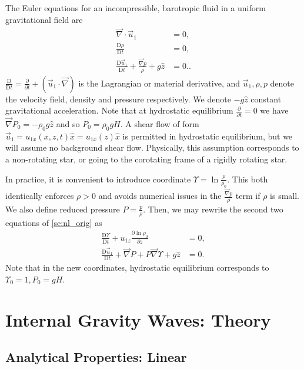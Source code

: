 \documentclass[
        fleqn,
        usenatbib,
    ]{mnras}
\newcommand*{\pd}[2]{\frac{\partial#1}{\partial#2}}
\newcommand*{\md}[2]{\frac{\mathrm{D}#1}{\mathrm{D}#2}}
\newcommand*{\p}[1]{\left(#1\right)}
\begin{document}
The Euler equations for an incompressible, barotropic fluid in a uniform
gravitational field are
\begin{subequations}\label{se:nl_orig}
    \begin{align}
        \vec{\nabla} \cdot \vec{u}_1 &= 0,\label{eq:nl_incomp}\\
        \md{\rho}{t} &= 0 ,\label{eq:nl_density}\\
        \md{\vec{u}_1}{t} + \frac{\vec{\nabla}p}{\rho} + g\hat{z} &=
            0.\label{eq:nl_mom}.
    \end{align}
\end{subequations}
$\md{}{t} = \pd{}{t} + \p{\vec{u}_1 \cdot \vec{\nabla}}$ is the Lagrangian or
material derivative, and $\vec{u}_1, \rho, p$ denote the velocity field, density
and pressure respectively. We denote $-g\hat{z}$ constant gravitational
acceleration. Note that at hydrostatic equilibrium $\pd{}{t} = 0$ we have
$\vec{\nabla}P_0 = -\rho_0 g\hat{z}$ and so $P_0 = \rho_0 gH$. A shear flow of
form $\vec{u}_1 = u_{1x}(x, z, t)\hat{x} = u_{1x}(z)\hat{x}$ is permitted in hydrostatic
equilibrium, but we will assume no background shear flow. Physically, this
assumption corresponds to a non-rotating star, or going to the corotating frame
of a rigidly rotating star.

In practice, it is convenient to introduce coordinate $\Upsilon = \ln
\frac{\rho}{\rho_0}$. This both identically enforces $\rho > 0$ and avoids
numerical issues in the $\frac{\vec{\nabla}p}{\rho}$ term if $\rho$ is small. We
also define reduced pressure $P = \frac{p}{\rho}$. Then, we may rewrite the
second two equations of \autoref{se:nl_orig} as
\begin{subequations}\label{se:nl_upsilon}
    \begin{align}
        \md{\Upsilon}{t} + u_{1z} \pd{\ln \rho_0}{z} &= 0
            ,\label{eq:nl_up_density} \\
        \md{\vec{u}_1}{t} + \vec{\nabla}P + P\vec{\nabla}\Upsilon + g\hat{z} &= 0.
    \end{align}
\end{subequations}
Note that in the new coordinates, hydrostatic equilibrium corresponds to
$\Upsilon_0 = 1, P_0 = gH$.

\section{Internal Gravity Waves: Theory}\label{s:theory}

\subsection{Analytical Properties: Linear}
\end{document}
